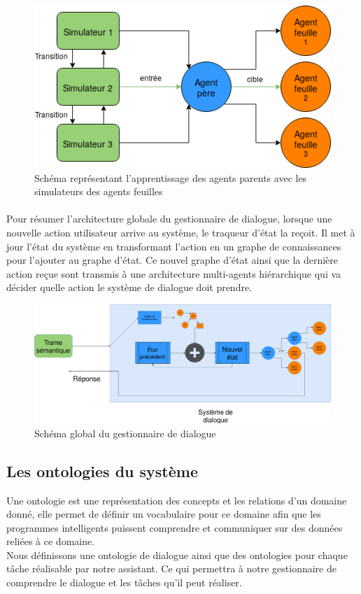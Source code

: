 \begin{figure}[H] 
	
	\centering
	\includegraphics[width=0.5\linewidth]{images/Conception/DM/train_parent.png}
	\caption{Schéma représentant l'apprentissage des agents parents avec les simulateurs des agents feuilles}
\end{figure}\label{train_parent}
\paragraph{}
Pour résumer l'architecture globale du gestionnaire de dialogue, lorsque une nouvelle action utilisateur arrive au système, le traqueur d'état la reçoit. Il met à jour l'état du système en transformant l'action en un graphe de connaissances pour l'ajouter au graphe d'état. Ce nouvel graphe d'état ainsi que la dernière action reçue sont transmis à une architecture multi-agents hiérarchique qui va décider quelle action le système de dialogue doit prendre.
\begin{figure}[H] 
	
	\centering
	\includegraphics[width=0.88\linewidth]{images/Conception/DM/globalDM.png}
	\caption{Schéma global du gestionnaire de dialogue}
\end{figure}\label{globalDM}
\subsection{Les ontologies du système}\label{onto}
Une ontologie est une représentation des concepts et les relations d'un domaine donné, elle permet de définir un vocabulaire pour ce domaine afin que les programmes intelligents puissent comprendre  et communiquer sur des données reliées à ce domaine.\\
Nous définissons une ontologie de dialogue ainsi que des ontologies pour chaque tâche réalisable par notre assistant. Ce qui permettra à notre gestionnaire de comprendre le dialogue et les tâches qu'il peut réaliser.
